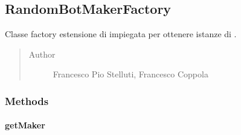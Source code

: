 \documentclass[letterpaper,10pt,italian]{sphinxmanual}
\begin{document}
\subsection{RandomBotMakerFactory}
\label{\detokenize{source/it/unicam/cs/pa/mastermind/factories/RandomBotMakerFactory:randombotmakerfactory}}\label{\detokenize{source/it/unicam/cs/pa/mastermind/factories/RandomBotMakerFactory::doc}}

\begin{fulllineitems}
\label{\detokenize{source/it/unicam/cs/pa/mastermind/factories/RandomBotMakerFactory:it.unicam.cs.pa.mastermind.factories.RandomBotMakerFactory}}
Classe factory estensione di  impiegata per ottenere istanze di .
\begin{quote}\begin{description}
\item[{Author}] \leavevmode
Francesco Pio Stelluti, Francesco Coppola

\end{description}\end{quote}

\end{fulllineitems}



\subsubsection{Methods}
\label{\detokenize{source/it/unicam/cs/pa/mastermind/factories/RandomBotMakerFactory:methods}}

\paragraph{getMaker}
\label{\detokenize{source/it/unicam/cs/pa/mastermind/factories/RandomBotMakerFactory:getmaker}}

\begin{fulllineitems}
\label{\detokenize{source/it/unicam/cs/pa/mastermind/factories/RandomBotMakerFactory:it.unicam.cs.pa.mastermind.factories.RandomBotMakerFactory.getMaker()}}
\end{fulllineitems}
\end{document}
